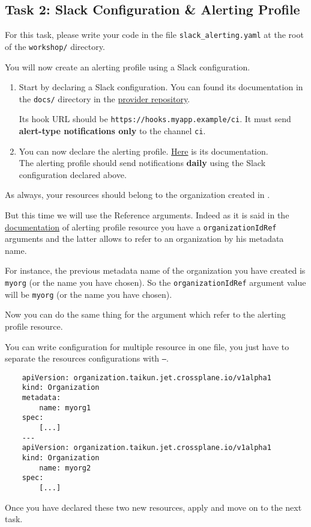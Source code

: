 \subsection{Task 2: Slack Configuration \& Alerting Profile}\label{sec:slack\_alerting}

\begin{note}
For this task, please write your code in the file \texttt{slack\_alerting.yaml}
at the root of the \texttt{workshop/} directory.
\end{note}

You will now create an alerting profile using a Slack configuration.

\begin{enumerate}
  \item Start by declaring a Slack configuration.
  You can found its documentation in the \texttt{docs/} directory in the 
  \href{https://github.com/itera-io/provider-jet-taikun/}{provider repository}.

Its hook URL should be \texttt{https://hooks.myapp.example/ci}.
It must send \textbf{alert-type notifications only} to the channel \texttt{ci}.
  \item You can now declare the alerting profile.
    \href{https://github.com/itera/provider-jet-taikun/tree/main/docs}{Here} is
     its documentation.\\
    The alerting profile should send notifications \textbf{daily} using the Slack
     configuration declared above.
\end{enumerate}

\begin{warn}
As always, your resources should belong to the organization created in
.
\end{warn}

But this time we will use the Reference arguments. Indeed as it is said in the 
\href{https://github.com/itera-io/provider-jet-taikun/tree/main/docs}{documentation}
 of alerting profile resource you have a \texttt{organizationIdRef} arguments and
  the latter allows to refer to an organization by his metadata name. 

For instance, the previous metadata name of the organization you have created is
 \texttt{myorg} (or the name you have chosen). So the \texttt{organizationIdRef}
  argument value will be \texttt{myorg} (or the name you have chosen).

Now you can do the same thing for the argument which refer to the alerting profile
 resource.

\begin{tip}
You can write configuration for multiple resource in one file, you just have to 
separate the resources configurations with \texttt{---}.
\begin{verbatim}
    apiVersion: organization.taikun.jet.crossplane.io/v1alpha1
    kind: Organization
    metadata:
        name: myorg1
    spec:
        [...]
    ---
    apiVersion: organization.taikun.jet.crossplane.io/v1alpha1
    kind: Organization
        name: myorg2
    spec:
        [...]
\end{verbatim}
\end{tip}
Once you have declared these two new resources, apply and move on to the next task.
